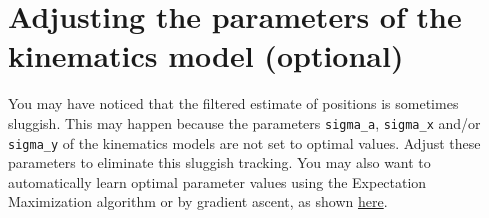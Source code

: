 \documentclass[12pt]{article}
\begin{document}
\section{Adjusting the parameters of the kinematics model (optional)}

You may have noticed that the filtered estimate of positions is sometimes
sluggish. This may happen because the parameters \texttt{sigma\_a},
\texttt{sigma\_x} and/or \texttt{sigma\_y} of the kinematics models are not set
to optimal values. Adjust these parameters to eliminate this sluggish tracking.
You may also want to automatically learn optimal parameter values using the
Expectation Maximization algorithm or by gradient ascent, as shown
\href{https://joacorapela.github.io/lds_python/auto_examples/tracking/plotEMvsGAcomparisonForagingMouse.html#sphx-glr-auto-examples-tracking-plotemvsgacomparisonforagingmouse-py}{here}.



\end{document}
